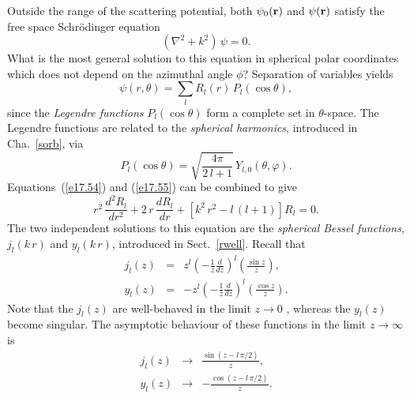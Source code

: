 Outside the range of the scattering potential, both $\psi_0({\bf r})$ and
$\psi({\bf r})$ satisfy the free space Schr\"{o}dinger equation 
\begin{equation}\label{e17.54}
(\nabla^2 + k^2)\,\psi = 0.
\end{equation}
What is the most general solution to this equation in spherical polar
coordinates which does not depend on the azimuthal angle $\phi$?
Separation of variables yields
\begin{equation}\label{e17.55}
\psi(r,\theta) = \sum_l R_l(r)\, P_l(\cos\theta),
\end{equation}
since the {\em Legendre functions}\/ $P_l(\cos\theta)$ form a complete
set in $\theta$-space. The Legendre functions are related to the
{\em spherical harmonics}, introduced in Cha.~\ref{sorb}, via
\begin{equation}
P_l(\cos\theta) = \sqrt{\frac{4\pi}{2\,l+1}}\, Y_{l,0}(\theta,\varphi).
\end{equation}
Equations~(\ref{e17.54}) and (\ref{e17.55}) can be combined to give
\begin{equation}
r^2\,\frac{d^2 R_l}{dr^2} + 2\,r \,\frac{dR_l}{dr} +  [k^2 \,r^2 -
l\,(l+1)]R_l = 0.
\end{equation}
The two independent solutions to this equation are the
{\em spherical Bessel functions}, $j_l(k\,r)$ and 
$y_l(k\,r)$, introduced in Sect.~\ref{rwell}.
Recall that
\begin{eqnarray}\label{e17.58a}
j_l(z) &=& z^l\left(-\frac{1}{z}\frac{d}{dz}\right)^l\left( \frac{\sin z}{z}\right),
\\[0.5ex]\label{e17.58b}
y_l(z) &=& -z^l\left(-\frac{1}{z}\frac{d}{dz}\right)^l \left(\frac{\cos z}{z}\right).
\end{eqnarray}
Note that  the $j_l(z)$ are well-behaved in the limit
$z\rightarrow 0$ , whereas the $y_l(z)$ become singular.
The asymptotic behaviour of these functions in the limit $z\rightarrow
\infty$ is
\begin{eqnarray}\label{e17.59a}
j_l(z) &\rightarrow &\frac{\sin(z - l\,\pi/2)}{z},\\[0.5ex]
y_l(z) &\rightarrow & - \frac{\cos(z-l\,\pi/2)}{z}.\label{e17.59b}
\end{eqnarray}

